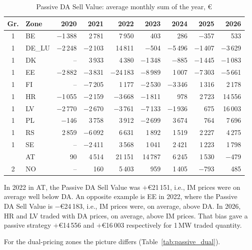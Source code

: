 \documentclass[11pt,a4paper]{article}
\begin{document}
\begin{table}[htbp]
\centering
\small
\setlength{\tabcolsep}{4pt}
\begin{tabular}{@{}c l rrrrrrr@{}}
\toprule
Gr. & Zone & 2020 & 2021 & 2022 & 2023 & 2024 & 2025 & 2026 \\
\midrule
1 & BE & $-$1\,388 & 2\,781 & 7\,950 & 403 & 286 & $-$357 & 533 \\
1 & DE\_LU & $-$2\,248 & $-$2\,103 & 14\,811 & $-$504 & $-$5\,496 & $-$1\,407 & $-$3\,629 \\
1 & DK & -- & 3\,933 & 4\,380 & $-$1\,348 & $-$885 & $-$1\,445 & $-$1\,083 \\
1 & EE & $-$2\,882 & $-$3\,831 & $-$24\,183 & $-$8\,989 & 1\,007 & $-$7\,303 & $-$5\,661 \\
1 & FI & -- & $-$7\,205 & 1\,177 & $-$2\,530 & $-$3\,346 & 1\,316 & 2\,178 \\
1 & HR & $-$1\,055 & $-$2\,159 & $-$3\,668 & $-$1\,811 & 978 & 2\,723 & 14\,556 \\
1 & LV & $-$2\,770 & $-$2\,670 & $-$3\,761 & $-$7\,133 & $-$1\,936 & 675 & 16\,003 \\
1 & PL & $-$146 & 3\,758 & 3\,912 & $-$2\,699 & 3\,674 & 764 & 7\,696 \\
1 & RS & 2\,859 & $-$6\,092 & 6\,631 & 1\,892 & 1\,519 & 2\,227 & 4\,275 \\
1 & SE & -- & $-$2\,411 & 3\,568 & 1\,041 & 2\,421 & 1\,223 & 1\,798 \\
\addlinespace
2 & AT & 90 & 4\,514 & 21\,151 & 14\,787 & 6\,245 & 1\,530 & $-$479 \\
2 & NO & -- & 160 & 5\,403 & 959 & 1\,405 & $-$793 & 485 \\
\bottomrule
\end{tabular}
\caption{Passive DA Sell Value: average monthly sum of the year, \euro}
\label{tab:passive_sell_single}
\end{table}

In 2022 in AT, the Passive DA Sell Value was $+$\euro21\,151, i.e., IM prices were on average well below DA. An opposite example is EE in 2022, where the Passive DA Sell Value is $-$\euro24\,183, i.e., IM prices were, on average, above DA. In 2026, HR and LV traded with DA prices, on average, above IM prices. That bias gave a passive strategy $+$\euro14\,556 and $+$\euro16\,003 respectively for 1\,MW traded quantity.

For the dual-pricing zones the picture differs (Table~\ref{tab:passive_dual}).
\end{document}
